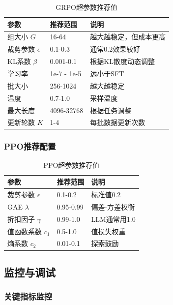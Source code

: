 \documentclass[12pt,a4paper]{article}
\begin{document}
\begin{table}[H]
\centering
\caption{GRPO超参数推荐值}
\begin{tabular}{lll}
\toprule
\textbf{参数} & \textbf{推荐范围} & \textbf{说明} \\
\midrule
组大小 $G$ & 16-64 & 越大越稳定，但成本更高 \\
裁剪参数 $\epsilon$ & 0.1-0.3 & 通常0.2效果较好 \\
KL系数 $\beta$ & 0.001-0.1 & 根据KL散度动态调整 \\
学习率 & 1e-7 - 1e-5 & 远小于SFT \\
批大小 & 256-1024 & 越大越稳定 \\
温度 & 0.7-1.0 & 采样温度 \\
最大长度 & 4096-32768 & 根据任务调整 \\
更新轮数 $K$ & 1-4 & 每批数据更新次数 \\
\bottomrule
\end{tabular}
\end{table}

\subsubsection{PPO推荐配置}

\begin{table}[H]
\centering
\caption{PPO超参数推荐值}
\begin{tabular}{lll}
\toprule
\textbf{参数} & \textbf{推荐范围} & \textbf{说明} \\
\midrule
裁剪参数 $\epsilon$ & 0.1-0.2 & 标准值0.2 \\
GAE $\lambda$ & 0.95-0.99 & 偏差-方差权衡 \\
折扣因子 $\gamma$ & 0.99-1.0 & LLM通常用1.0 \\
值函数系数 $c_1$ & 0.5-1.0 & 值损失权重 \\
熵系数 $c_2$ & 0.01-0.1 & 探索鼓励 \\
\bottomrule
\end{tabular}
\end{table}

\subsection{监控与调试}

\subsubsection{关键指标监控}
\end{document}
